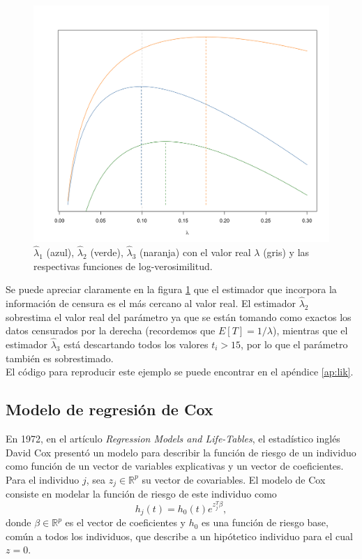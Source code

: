 \documentclass[11pt,a4paper]{article}
\begin{document}
\begin{figure}[H] 
\centering\includegraphics[width=12cm]{likelihood.png}
\caption{$\hat{\lambda}_1$ (azul), $\hat{\lambda}_2$ (verde), $\hat{\lambda}_3$ (naranja) con el valor real $\lambda$ (gris) y las respectivas funciones de log-verosimilitud.}
\label{fig:lik}
\end{figure}

Se puede apreciar claramente en la figura \ref{fig:lik} que el estimador que incorpora la información de censura es el más cercano al valor real. El estimador $\hat{\lambda}_2$ sobrestima el valor real del parámetro ya que se están tomando como exactos los datos censurados por la derecha (recordemos que $E[T] = 1/\lambda$), mientras que el estimador $\hat{\lambda}_3$ está descartando todos los valores $t_i > 15$, por lo que el parámetro también es sobrestimado.\\

El código para reproducir este ejemplo se puede encontrar en el apéndice \ref{ap:lik}.

\subsection{Modelo de regresión de Cox}
\label{seccion_coxph}
En 1972, en el artículo \textit{Regression Models and Life-Tables}, el estadístico inglés David Cox presentó un modelo para describir la función de riesgo de un individuo como función de un vector de variables explicativas y un vector de coeficientes.\\

Para el individuo $j$, sea $z_j\in \mathbb{R}^p$ su vector de covariables. El modelo de Cox consiste en modelar la función de riesgo de este individuo como
\begin{equation} \label{cox_ph}
h_j(t) = h_0(t)e^{z_j^T\beta},
\end{equation}
donde $\beta\in \mathbb{R}^p$ es el vector de coeficientes y $h_0$ es una función de riesgo base, común a todos los individuos, que describe a un hipótetico individuo para el cual $z = 0$.\\
\end{document}
